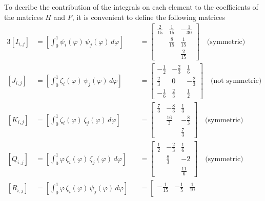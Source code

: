 \documentclass[10pt]{article}
\begin{document}
\noindent To decribe the contribution of the integrals on each element to the coefficients of the matrices $H$ and $F$, it is convenient to define the following matrices
\renewcommand\arraystretch{1.5}
\begin{alignat*}{3}
   [I_{i,j}]&=\left[\int_0^1 \psi_i(\varphi)\, \psi_j(\varphi)\,d\varphi\right]&&=\left[
     \begin{array}{ccc}
      \frac{2}{15}  & \frac{1}{15} & -\frac{1}{30} \\
                    & \frac{8}{15}  &  \frac{1}{15} \\
                    &               & \frac{2}{15} 
     \end{array}
   \right] \quad\text{(symmetric)}
  \\ [J_{i,j}]&=\left[\int_0^1 \zeta_i(\varphi) \,\psi_j(\varphi)\,d\varphi\right]&&=\left[
     \begin{array}{ccc}
      -\frac{1}{2}  & -\frac{2}{3} & \frac{1}{6} \\
      \frac{2}{3}  & 0           &  -\frac{2}{3} \\
      -\frac{1}{6}  & \frac{2}{3} & \frac{1}{2} 
     \end{array}
   \right]  \quad\text{(not symmetric)}
  \\ [K_{i,j}]&=\left[\int_0^1  \zeta_i(\varphi)\, \zeta_j(\varphi)\,d\varphi\right]&&=\left[
     \begin{array}{ccc}
      \frac{7}{3}  & -\frac{8}{3} & \frac{1}{3} \\
                   & \frac{16}{3}  &  -\frac{8}{3} \\
                   &               & \frac{7}{3} 
     \end{array}
   \right]  \quad\text{(symmetric)}
    \\ [Q_{i,j}]&=\left[\int_0^1 \varphi \, \zeta_i(\varphi) \, \zeta_j(\varphi)\,d\varphi\right]&&=\left[
     \begin{array}{ccc}
      \frac{1}{2}  & -\frac{2}{3} & \frac{1}{6} \\
                   & \frac{8}{3}  &  -2 \\
                   &             & \frac{11}{6} 
     \end{array}
   \right]  \quad\text{(symmetric)}
    \\ [R_{i,j}]&=\left[\int_0^1 \varphi \,\zeta_i(\varphi)\, \psi_j(\varphi)\,d\varphi\right]&&=\left[
     \begin{array}{ccc}
      -\frac{1}{15}  & -\frac{1}{5} & \frac{1}{10} \\

\end{array}
\end{alignat*}
\end{document}
